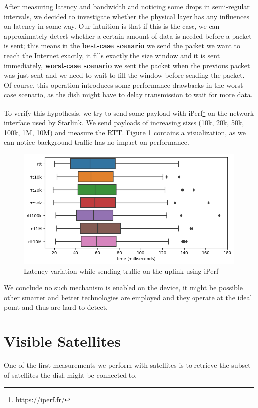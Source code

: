 \documentclass[IN,11pt,twoside,openright,idp,english]{tumthesis}
\begin{document}
After measuring latency and bandwidth and noticing some drops in semi-regular intervals, we decided to investigate
whether the physical layer has any influences on latency in some way. Our intuition is that if this is the case, we can
approximately detect whether a certain amount of data is needed before a packet is sent; this means in the \textbf{best-case
scenario} we send the packet we want to reach the Internet exactly, it fills exactly the size window and it is sent
immediately, \textbf{worst-case scenario} we sent the packet when the previous packet was just sent and we need to wait to fill
the window before sending the packet. Of course, this operation introduces some performance drawbacks in the worst-case
scenario, as the dish might have to delay transmission to wait for more data.

To verify this hypothesis, we try to send some payload with iPerf\footnote{\url{https://iperf.fr/}} on the network
interface used by Starlink. We send payloads of increasing sizes (10k, 20k, 50k, 100k, 1M, 10M) and measure the RTT. 
Figure \ref{fig:rtt-iperf} contains a visualization, as we can notice background traffic has no impact on performance.
\begin{figure}
    \label{fig:rtt-iperf}
    \centering
    \includegraphics[width=0.6\columnwidth]{img/latency_iperf.png}
    \caption{Latency variation while sending traffic on the uplink using iPerf}
\end{figure}

We conclude no such mechanism is enabled on the device, it might be possible other smarter and better technologies are
employed and they operate at the ideal point and thus are hard to detect.

\section{Visible Satellites}

One of the first measurements we perform with satellites is to retrieve the subset of satellites the dish might be
connected to.
\end{document}

